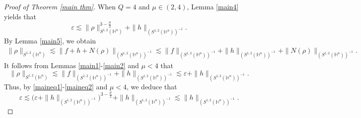 \documentclass[11pt]{article}
\begin{document}
  \begin{proof}
[Proof of Theorem \ref{main thm}]
When $Q=4$ and $\mu\in (2,4)$,  Lemma \ref{main4} yields that
    \begin{equation}\label{maineq1}
     \varepsilon \lesssim  \|\rho\|_{S^{1,2}(\mathbb{H}^{n})}^{3-\frac{\mu}{2}}+\|h\|_{(S^{1,2}(\mathbb{H}^{n}))^{-1}}.
   \end{equation}
   By Lemma \ref{main5}, we obtain
   \begin{equation*}
   \begin{aligned}
   \|\rho\|_{S^{1,2}(\mathbb{H}^{n})}\lesssim \|f+h+N(\rho)\|_{(S^{1,2}(\mathbb{H}^{n}))^{-1}}
   \lesssim \|f\|_{(S^{1,2}(\mathbb{H}^{n}))^{-1}}+\|h\|_{(S^{1,2}(\mathbb{H}^{n}))^{-1}}+
   \|N(\rho)\|_{(S^{1,2}(\mathbb{H}^{n}))^{-1}}.
   \end{aligned}
   \end{equation*}
  It follows from Lemmas \ref{main1}-\ref{main2} and $\mu<4$ that
  \begin{equation}\label{maineq2}
 \|\rho\|_{S^{1,2}(\mathbb{H}^{n})}  \lesssim \|f\|_{(S^{1,2}(\mathbb{H}^{n}))^{-1}}+\|h\|_{(S^{1,2}(\mathbb{H}^{n}))^{-1}} \lesssim  \varepsilon+\|h\|_{(S^{1,2}(\mathbb{H}^{n}))^{-1}}.
  \end{equation}
  Thus, by \eqref{maineq1}-\eqref{maineq2} and $\mu<4$, we deduce that
  \begin{equation*}%
    \varepsilon \lesssim \big(\varepsilon+\|h\|_{(S^{1,2}(\mathbb{H}^{n}))^{-1}}\big)^{3-\frac{\mu}{2}}+
    \|h\|_{(S^{1,2}(\mathbb{H}^{n}))^{-1}} \lesssim \|h\|_{(S^{1,2}(\mathbb{H}^{n}))^{-1}}.
  \end{equation*}

\end{proof}
\end{document}
